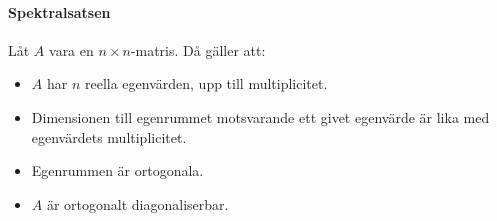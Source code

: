 \paragraph{Spektralsatsen}
Låt $A$ vara en $n\times n$-matris. Då gäller att:
\begin{itemize}
	\item $A$ har $n$ reella egenvärden, upp till multiplicitet.
	\item Dimensionen till egenrummet motsvarande ett givet egenvärde är lika med egenvärdets multiplicitet.
	\item Egenrummen är ortogonala.
	\item $A$ är ortogonalt diagonaliserbar.
\end{itemize}

\proof